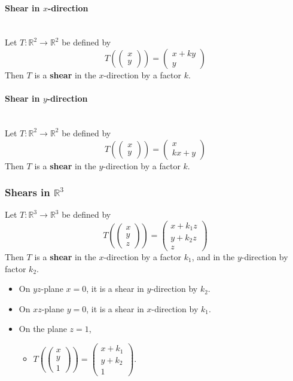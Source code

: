 \documentclass[../ma2001_notes.tex]{subfiles}
\begin{document}
\paragraph{Shear in \(x\)-direction}\,\\
Let \(T:\mathbb{R}^2\to\mathbb{R}^2\) be defined by
\[T\left(\begin{pmatrix}
	x \\ y
\end{pmatrix}\right)=\begin{pmatrix}
	x+ky \\ y
\end{pmatrix}\]
Then \(T\) is a \textbf{shear} in the \(x\)-direction by a factor \(k\).

\paragraph{Shear in \(y\)-direction}\,\\
Let \(T:\mathbb{R}^2\to\mathbb{R}^2\) be defined by
\[T\left(\begin{pmatrix}
	x \\ y
\end{pmatrix}\right)=\begin{pmatrix}
	x \\ kx+y
\end{pmatrix}\]
Then \(T\) is a \textbf{shear} in the \(y\)-direction by a factor \(k\).

\subsubsection{Shears in $\mathbb{R}^3$}
Let \(T:\mathbb{R}^3\to\mathbb{R}^3\) be defined by
\[T\left(\begin{pmatrix}
	x \\ y \\ z
\end{pmatrix}\right)=\begin{pmatrix}
	x+k_1z \\ y+k_2z \\ z
\end{pmatrix}\]
Then \(T\) is a \textbf{shear} in the \(x\)-direction by a factor \(k_1\), and in the \(y\)-direction by factor \(k_2\).
\begin{itemize}
 	\item On \(yz\)-plane \(x=0\), it is a shear in \(y\)-direction by \(k_2\).
 	\item On \(xz\)-plane \(y=0\), it is a shear in \(x\)-direction by \(k_1\).
 	\item On the plane \(z=1\),
 	\begin{itemize}
 		\item\(T\left(\begin{pmatrix}
 			x \\ y \\ 1
 		\end{pmatrix}\right)=\begin{pmatrix}
 			x+k_1 \\ y+k_2 \\ 1
 		\end{pmatrix}\).
 	\end{itemize}
\end{itemize}
\end{document}
